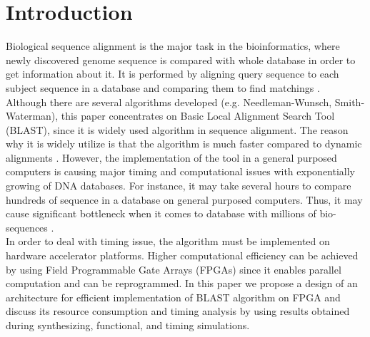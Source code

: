 \section{Introduction}
\label{sec:introduction}

Biological sequence alignment is the major task in the bioinformatics, where newly discovered genome sequence is compared with whole database in order to get information about it. It is performed by aligning query sequence to each subject sequence in a database and comparing them to find matchings \cite{guo2012systolic}.
\\
Although there are several algorithms developed (e.g. Needleman-Wunsch, Smith-Waterman), this paper concentrates on Basic Local Alignment Search Tool (BLAST), since it is widely used algorithm in sequence alignment. The reason why it is widely utilize is that the algorithm is much faster compared to dynamic alignments \cite{kasap2008design}. However, the implementation of the tool in a general purposed computers is causing major timing and computational issues with exponentially growing of DNA databases. For instance, it may take several hours to compare hundreds of sequence in a database on general purposed computers. Thus, it may cause significant bottleneck when it comes to database with millions of bio-sequences \cite{sarkar2010hardware}.
\\
In order to deal with timing issue, the algorithm must be implemented on hardware accelerator platforms. Higher computational efficiency can be achieved by using Field Programmable Gate Arrays (FPGAs) since it enables parallel computation and can be reprogrammed. In this paper we propose a design of an architecture for efficient implementation of BLAST algorithm on FPGA and discuss its resource consumption and timing analysis by using results obtained during synthesizing, functional, and timing simulations. 

